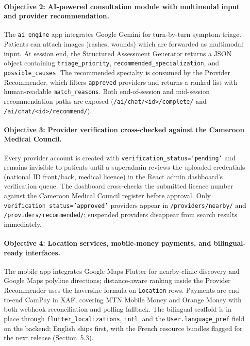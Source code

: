 \paragraph{Objective 2: AI-powered consultation module with multimodal input and provider recommendation.}
The \texttt{ai\_engine} app integrates Google Gemini for turn-by-turn symptom triage. Patients can attach images (rashes, wounds) which are forwarded as multimodal input. At session end, the Structured Assessment Generator returns a JSON object containing \texttt{triage\_priority}, \texttt{recommended\_specialization}, and \texttt{possible\_causes}. The recommended specialty is consumed by the Provider Recommender, which filters \texttt{approved} providers and returns a ranked list with human-readable \texttt{match\_reasons}. Both end-of-session and mid-session recommendation paths are exposed (\texttt{/ai/chat/<id>/complete/} and \texttt{/ai/chat/<id>/recommend/}).

\paragraph{Objective 3: Provider verification cross-checked against the Cameroon Medical Council.}
Every provider account is created with \texttt{verification\_status='pending'} and remains invisible to patients until a superadmin reviews the uploaded credentials (national ID front/back, medical licence) in the React admin dashboard's verification queue. The dashboard cross-checks the submitted licence number against the Cameroon Medical Council register before approval. Only \texttt{verification\_status='approved'} providers appear in \texttt{/providers/nearby/} and \texttt{/providers/recommended/}; suspended providers disappear from search results immediately.

\paragraph{Objective 4: Location services, mobile-money payments, and bilingual-ready interfaces.}
The mobile app integrates Google Maps Flutter for nearby-clinic discovery and Google Maps polyline directions; distance-aware ranking inside the Provider Recommender uses the haversine formula on \texttt{Location} rows. Payments are end-to-end CamPay in XAF, covering MTN Mobile Money and Orange Money with both webhook reconciliation and polling fallback. The bilingual scaffold is in place through \texttt{flutter\_localizations}, \texttt{intl}, and the \texttt{User.language\_pref} field on the backend; English ships first, with the French resource bundles flagged for the next release (Section~5.3).

